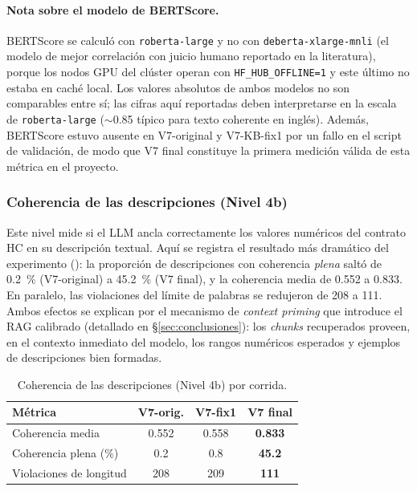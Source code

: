 \paragraph{Nota sobre el modelo de BERTScore.} BERTScore se calculó con
\texttt{roberta-large} y no con \texttt{deberta-xlarge-mnli} (el modelo de mejor
correlación con juicio humano reportado en la literatura), porque los nodos GPU
del clúster operan con \verb|HF_HUB_OFFLINE=1| y este último no estaba en caché
local. Los valores absolutos de ambos modelos no son comparables entre sí; las
cifras aquí reportadas deben interpretarse en la escala de \texttt{roberta-large}
($\sim$\num{0.85} típico para texto coherente en inglés). Además, BERTScore estuvo
ausente en V7-original y V7-KB-fix1 por un fallo en el script de validación, de
modo que V7 final constituye la primera medición válida de esta métrica en el
proyecto.

\subsubsection{Coherencia de las descripciones (Nivel 4b)}
\label{sec:res-l4b}

Este nivel mide si el LLM ancla correctamente los valores numéricos del contrato
HC en su descripción textual. Aquí se registra el resultado más dramático del
experimento (): la proporción de descripciones con coherencia
\emph{plena} saltó de \SI{0.2}{\percent} (V7-original) a \SI{45.2}{\percent}
(V7 final), y la coherencia media de \num{0.552} a \num{0.833}. En paralelo, las
violaciones del límite de palabras se redujeron de 208 a 111. Ambos efectos se
explican por el mecanismo de \emph{context priming} que introduce el RAG calibrado
(detallado en §\ref{sec:conclusiones}): los \emph{chunks} recuperados proveen, en
el contexto inmediato del modelo, los rangos numéricos esperados y ejemplos de
descripciones bien formadas.

\begin{table}[H]
  \centering
  \caption{Coherencia de las descripciones (Nivel 4b) por corrida.}
  \label{tab:l4b}
  \begin{tabular}{lccc}
    \toprule
    Métrica & V7-orig. & V7-fix1 & \textbf{V7 final} \\
    \midrule
    Coherencia media          & 0.552 & 0.558 & \textbf{0.833} \\
    Coherencia plena (\%)     & 0.2   & 0.8   & \textbf{45.2} \\
    Violaciones de longitud   & 208   & 209   & \textbf{111} \\
    \bottomrule
  \end{tabular}
\end{table}

